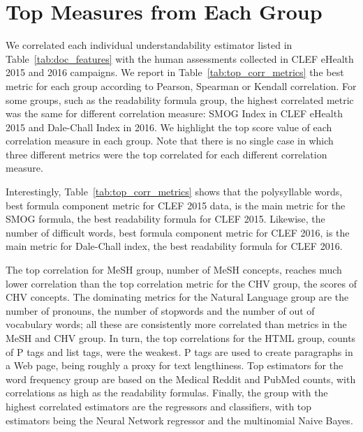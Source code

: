 

\section{Top Measures from Each Group}
\label{sec:beyond_readability}

We correlated each individual understandability estimator listed in Table~\ref{tab:doc_features}  with the human assessments collected in CLEF eHealth 2015 and 2016 campaigns.
We report in Table~\ref{tab:top_corr_metrics} the best metric for each group according to Pearson, Spearman or Kendall correlation.
For some groups, such as the readability formula group, the highest correlated metric was the same for different correlation measure: SMOG Index in CLEF eHealth 2015 and Dale-Chall Index in 2016. 
We highlight the top score value of each correlation measure in each group. Note that there is no single case in which three different metrics were the top correlated for each different correlation measure.

Interestingly, Table~\ref{tab:top_corr_metrics} shows that the polysyllable words, best formula component metric for CLEF 2015 data, is the main metric for the SMOG formula, the best readability formula for CLEF 2015. 
Likewise, the number of difficult words, best formula component metric for CLEF 2016, is the main metric for Dale-Chall index, the best readability formula for CLEF 2016.

The top correlation for MeSH group, number of MeSH concepts, reaches much lower correlation than the top correlation metric for the CHV group, the scores of CHV concepts.
The dominating metrics for the Natural Language group are the number of pronouns, the number of stopwords and the number of out of vocabulary words; all these are consistently more correlated than metrics in the MeSH and CHV group.
In turn, the top correlations for the HTML group, counts of P tags and list tags, were the weakest. P tags are used to create paragraphs in a Web page, being roughly a proxy for text lengthiness. 
Top estimators for the word frequency group are based on the Medical Reddit and PubMed counts, with correlations as high as the readability formulas.
Finally, the group with the highest correlated estimators are the regressors and classifiers, with top estimators being the Neural Network regressor and the multinomial Naive Bayes.
%

%


